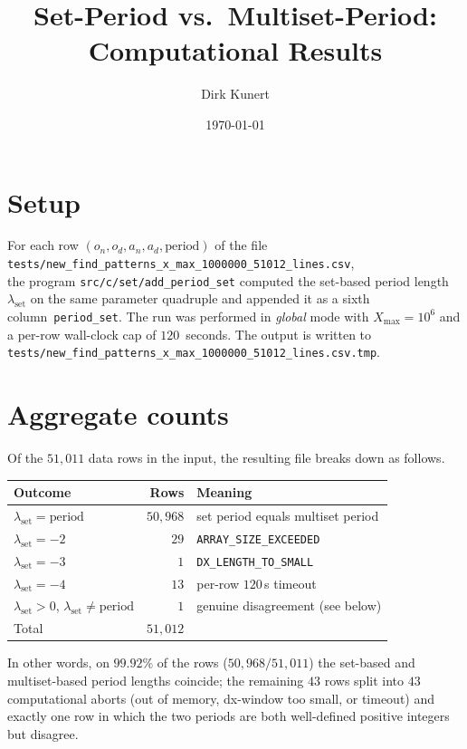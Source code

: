 \documentclass[11pt]{article}
\title{Set-Period vs.\ Multiset-Period: Computational Results}
\author{Dirk Kunert}
\date{\today}
\begin{document}
\maketitle

\section*{Setup}

For each row $(o_n, o_d, a_n, a_d, \mathrm{period})$ of the file \\
\texttt{tests/new\_find\_patterns\_x\_max\_1000000\_51012\_lines.csv}, \\
the
program \texttt{src/c/set/add\_period\_set} computed the set-based period
length $\lambda_{\text{set}}$ on the same parameter quadruple and appended
it as a sixth column~\texttt{period\_set}. The run was performed in
\emph{global} mode with $X_{\max}=10^{6}$ and a per-row wall-clock cap of
$120$~seconds. The output is written to
\texttt{tests/new\_find\_patterns\_x\_max\_1000000\_51012\_lines.csv.tmp}.

\section*{Aggregate counts}

Of the $51{,}011$ data rows in the input, the resulting file breaks down
as follows.

\begin{center}
\begin{tabular}{lrl}
\toprule
Outcome & Rows & Meaning \\
\midrule
$\lambda_{\text{set}} = \mathrm{period}$  & $50{,}968$ & set period equals multiset period \\
$\lambda_{\text{set}} = -2$ & $29$ & \texttt{ARRAY\_SIZE\_EXCEEDED} \\
$\lambda_{\text{set}} = -3$ & $1$  & \texttt{DX\_LENGTH\_TO\_SMALL} \\
$\lambda_{\text{set}} = -4$ & $13$ & per-row $120$\,s timeout \\
$\lambda_{\text{set}} > 0$, $\lambda_{\text{set}} \neq \mathrm{period}$ & $1$ & genuine disagreement (see below) \\
\midrule
Total                                     & $51{,}012$ & \\
\bottomrule
\end{tabular}
\end{center}

In other words, on $99.92\%$ of the rows ($50{,}968 / 51{,}011$) the
set-based and multiset-based period lengths coincide; the remaining
$43$ rows split into $43$ computational aborts (out of memory, dx-window
too small, or timeout) and exactly one row in which the two periods are
both well-defined positive integers but disagree.
\end{document}
